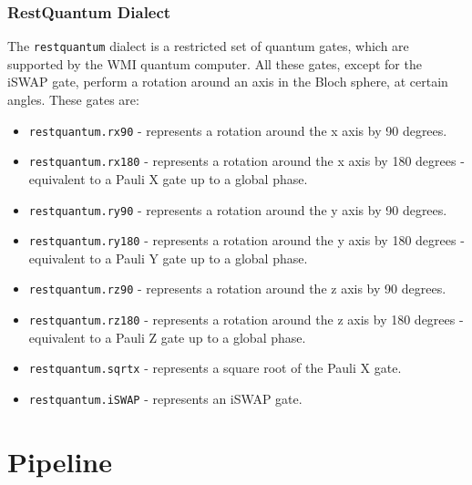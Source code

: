  \subsubsection{RestQuantum Dialect}
    The \texttt{restquantum} dialect is a restricted set of quantum gates, which
    are supported by the WMI quantum computer. All these gates, except for the iSWAP gate, 
    perform a rotation around an axis in the Bloch sphere, at certain angles.
    These gates are:
    \begin{itemize}
    \item \texttt{restquantum.rx90} - represents a rotation around the x axis by
    90 degrees.
    \item \texttt{restquantum.rx180} - represents a rotation around the x axis
    by 180 degrees - equivalent to a Pauli X gate up to a global phase.
    \item \texttt{restquantum.ry90} - represents a rotation around the y axis by
    90 degrees.
    \item \texttt{restquantum.ry180} - represents a rotation around the y axis
    by 180 degrees - equivalent to a Pauli Y gate up to a global phase.
    \item \texttt{restquantum.rz90} - represents a rotation around the z axis by
    90 degrees.
    \item \texttt{restquantum.rz180} - represents a rotation around the z axis
    by 180 degrees - equivalent to a Pauli Z gate up to a global phase.
    \item \texttt{restquantum.sqrtx} - represents a square root of the Pauli X
    gate.
    \item \texttt{restquantum.iSWAP} - represents an iSWAP gate.
    \end{itemize}


\section{Pipeline}
